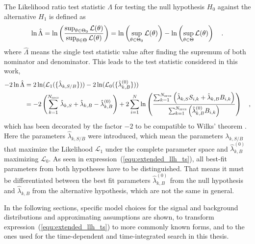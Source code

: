 The Likelihood ratio test statistic $\Lambda$ for testing the null hypothesis $H_0$ against the alternative $H_1$ is defined as \cite{casella2002statistical}
\begin{equation}
  \ln\hat{\Lambda}
  = \ln\left(\frac{\sup_{\theta \in \Theta_0} \mathcal{L}(\theta)}
                  {\sup_{\theta \in \Theta} \mathcal{L}(\theta)}\right)
  = \ln\left(\sup_{\theta \in \Theta_0} \mathcal{L}(\theta)\right) -
    \ln\left(\sup_{\theta \in \Theta} \mathcal{L}(\theta)\right)
  \quad\text{.}
\end{equation}
where $\hat{\Lambda}$ means the single test statistic value after finding the supremum of both nominator and denominator.
This leads to the test statistic considered in this work,
\begin{equation}
  \label{equ:extended_llh_ts}
  \begin{aligned}
    -2\ln\hat{\Lambda}
    &= 2\ln(\mathcal{L}_1(\{\hat{\lambda}_{k,S/B}\})) -
       2\ln(\mathcal{L}_0(\{\hat{\lambda}^{(0)}_{k,B}\})) \\
    &= -2\left(\sum_{k=1}^{N_\text{srcs}}\hat{\lambda}_{k,S} +
                                         \hat{\lambda}_{k,B} -
                                         \hat{\lambda}_{k,B}^{(0)}\right) +
      2\sum_{i=1}^N \ln\left(
        \frac{\sum_{k=1}^{N_\text{srcs}}\left(
            \hat{\lambda}_{k,S} S_{i,k}+\hat{\lambda}_{k,B} B_{i,k}\right)}
            {\sum_{k=1}^{N_\text{srcs}}\left(
              \hat{\lambda}_{k,B}^{(0)} B_{i,k}
            \right)}
          \right)
    \quad\text{,}
  \end{aligned}
\end{equation}
which has been decorated by the factor $-2$ to be compatible to Wilks' theorem \cite{Wilks:1938dza,casella2002statistical}.
Here the parameters $\hat{\lambda}_{k,S/B}$ were introduced, which mean the parameters $\lambda_{k,S/B}$ that maximize the Likelihood $\mathcal{L}_1$ under the complete parameter space and $\hat{\lambda}_{k,B}^{(0)}$ maximizing $\mathcal{L}_0$.
As seen in expression~(\ref{equ:extended_llh_ts}), all best-fit parameters from both hypotheses have to be distinguished.
That means it must be differentiated between the best fit parameters $\hat{\lambda}_{k,B}^{(0)}$ from the null hypothesis and $\hat{\lambda}_{k,B}$ from the alternative hypothesis, which are not the same in general.

In the following sections, specific model choices for the signal and background distributions and approximating assumptions are shown, to transform expression~(\ref{equ:extended_llh_ts}) to more commonly known forms, and to the ones used for the time-dependent and time-integrated search in this thesis.


